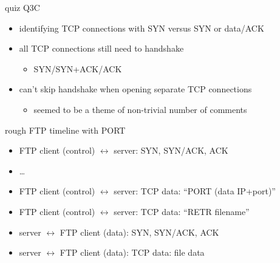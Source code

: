 \begin{frame}{quiz Q3C}
    \begin{itemize}
    \item identifying TCP connections with SYN versus SYN or data/ACK
    \vspace{.5cm}
    \item all TCP connections still need to handshake
        \begin{itemize}
        \item SYN/SYN+ACK/ACK
        \end{itemize}
    \item can't skip handshake when opening separate TCP connections
        \begin{itemize}
        \item seemed to be a theme of non-trivial number of comments
        \end{itemize}
    \end{itemize}
\end{frame}

\begin{frame}{rough FTP timeline with PORT}
    \begin{itemize}
    \item FTP client (control) $\leftrightarrow$ server: SYN, SYN/ACK, ACK 
    \item \ldots
    \item FTP client (control) $\leftrightarrow$ server: TCP data: ``PORT (data IP+port)''
    \item FTP client (control) $\leftrightarrow$ server: TCP data: ``RETR filename''
    \item server $\leftrightarrow$ FTP client (data): SYN, SYN/ACK, ACK
    \item server $\leftrightarrow$ FTP client (data): TCP data: file data
    \end{itemize}
\end{frame}
